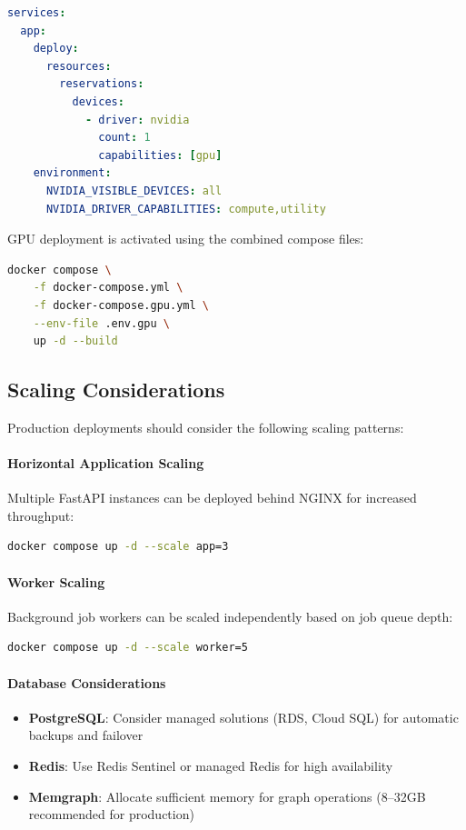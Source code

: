 \begin{lstlisting}[language=yaml, caption=GPU configuration in docker-compose.gpu.yml]
services:
  app:
    deploy:
      resources:
        reservations:
          devices:
            - driver: nvidia
              count: 1
              capabilities: [gpu]
    environment:
      NVIDIA_VISIBLE_DEVICES: all
      NVIDIA_DRIVER_CAPABILITIES: compute,utility
\end{lstlisting}

GPU deployment is activated using the combined compose files:

\begin{lstlisting}[language=bash, caption=GPU deployment command]
docker compose \
    -f docker-compose.yml \
    -f docker-compose.gpu.yml \
    --env-file .env.gpu \
    up -d --build
\end{lstlisting}

\subsection{Scaling Considerations}

Production deployments should consider the following scaling patterns:

\paragraph{Horizontal Application Scaling}
Multiple FastAPI instances can be deployed behind NGINX for increased throughput:

\begin{lstlisting}[language=bash, caption=Scaling application instances]
docker compose up -d --scale app=3
\end{lstlisting}

\paragraph{Worker Scaling}
Background job workers can be scaled independently based on job queue depth:

\begin{lstlisting}[language=bash, caption=Scaling worker processes]
docker compose up -d --scale worker=5
\end{lstlisting}

\paragraph{Database Considerations}
\begin{itemize}
    \item \textbf{PostgreSQL}: Consider managed solutions (RDS, Cloud SQL) for automatic backups and failover
    \item \textbf{Redis}: Use Redis Sentinel or managed Redis for high availability
    \item \textbf{Memgraph}: Allocate sufficient memory for graph operations (8--32GB recommended for production)
\end{itemize}

